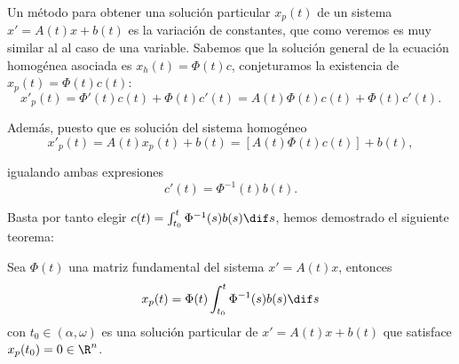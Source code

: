 \documentclass[../main.tex]{subfiles}
\begin{document}
Un método para obtener una solución particular \(x_p(t)\) de un sistema 
\(x' = A(t)x + b(t)\) es la variación de constantes, que como veremos es muy
similar al al caso de una variable. Sabemos que la solución general de la
ecuación homogénea asociada es \(x_h(t) = \Phi(t)c\), conjeturamos la existencia
de \(x_p(t) = \Phi(t) c(t)\):
\[x'_p(t) = \Phi'(t) c(t) + \Phi(t) c'(t) = A(t )\Phi(t) c(t) + \Phi(t) c'(t).\]

Además, puesto que es solución del sistema homogéneo
\[x'_p(t) = A(t)x_p(t) + b(t) = [A(t) \Phi(t) c(t)] + b(t),\]

igualando ambas expresiones
\[c'(t) = \Phi^{-1}(t) b(t).\]

Basta por tanto elegir \(c(t) = \int_{t_0}^t \Phi^{-1}(s) b(s) \dif s\), hemos
demostrado el siguiente teorema:

\begin{theorem}
	Sea \(\Phi(t)\) una matriz fundamental del sistema \(x' = A(t)x\), entonces 
	\[x_p(t) = \Phi(t) \int_{t_0}^t \Phi^{-1}(s) b(s) \dif s\]
	con \(t_0 \in (\alpha, \omega)\) es una solución particular de 
	\(x' = A(t)x + b(t)\) que satisface \(x_p(t_0) = 0 \in \R^n\).
\end{theorem}
\end{document}
